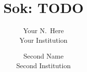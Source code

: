 \documentclass[letterpaper,twocolumn,10pt]{article}
\begin{document}
\date{}

\title{Sok: TODO}

\author{{\rm Your N.\ Here}\\
  Your Institution
  \and
  {\rm Second Name}\\
  Second Institution
} %


\maketitle

\thispagestyle{empty}

{}
{}
{}
{}
{}
{}
{}
{}
{}
{}
{}



\end{document}
